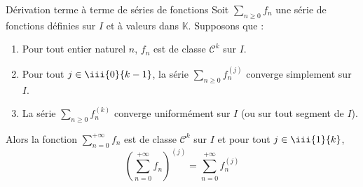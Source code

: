 \documentclass[french,11pt,twoside]{VcCours}
\begin{document}
\begin{Theoreme}{Dérivation terme à terme de séries de fonctions}
Soit $\sum_{n \geq 0} f_n$ une série de fonctions définies sur $I$ et à valeurs dans $\mathbb{K}$. Supposons que :

\begin{enumerate}
\item Pour tout entier naturel $n$, $f_n$ est de classe $\mathcal{C}^k$ sur $I$.
\item Pour tout $j \in \iii{0}{k-1}$, la série $\sum_{n \geq 0} f_n^{(j)}$ converge simplement sur $I$.
\item La série $\sum_{n \geq 0} f_n^{(k)}$ converge uniformément sur $I$ (ou sur tout segment de $I$).
\end{enumerate}
Alors la fonction $\sum_{n=0}^{+ \infty} f_n$ est de classe $\mathcal{C}^k$ sur $I$ et pour tout $j \in \iii{1}{k}$,
$$ \left( \sum_{n=0}^{+ \infty} f_n \right)^{(j)} = \sum_{n=0}^{+ \infty} f_n^{(j)}$$
\end{Theoreme}
\end{document}
